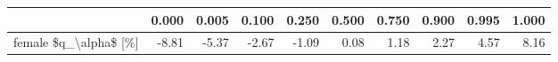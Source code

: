 \begin{tabular}{lrrrrrrrrr}
\toprule
{} &  0.000 &  0.005 &  0.100 &  0.250 &  0.500 &  0.750 &  0.900 &  0.995 &  1.000 \\
\midrule
female \$q\_\textbackslash alpha\$ [\%] &  -8.81 &  -5.37 &  -2.67 &  -1.09 &   0.08 &   1.18 &   2.27 &   4.57 &   8.16 \\
\bottomrule
\end{tabular}
